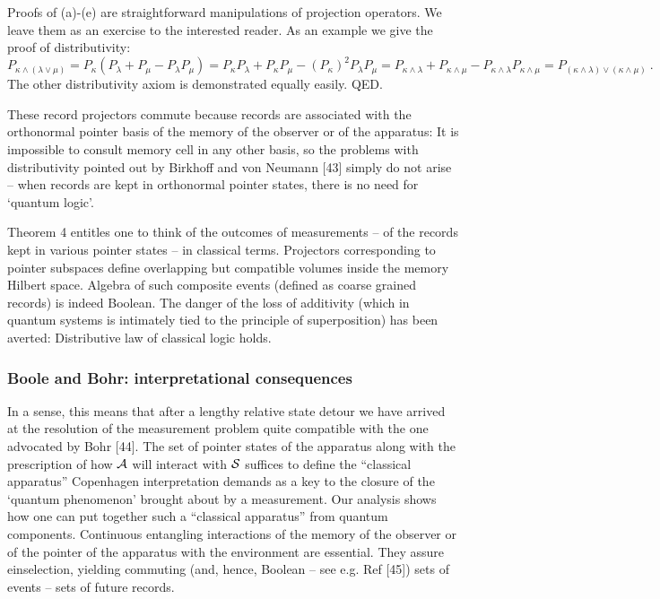\documentclass[aps,twocolumn,pra,epsfig]{revtex4}
\begin{document}
Proofs of (a)-(e) are straightforward manipulations of projection operators.
We leave them as an exercise to the interested reader. As an example we give
the proof of distributivity:
$P_{\kappa\wedge(\lambda\vee\mu)} =
P_{\kappa}(P_{\lambda} + P_{\mu} - P_{\lambda} P_{\mu}) =
P_{\kappa}P_{\lambda} + P_{\kappa}P_{\mu} - (P_{\kappa})^2P_{\lambda} P_{\mu}
 = P_{\kappa \wedge \lambda} + P_{\kappa \wedge \mu} - P_{\kappa \wedge 
\lambda} P_{\kappa \wedge \mu} =
P_{(\kappa \wedge \lambda) \vee (\kappa \wedge \mu)} \ . $ 
The other distributivity axiom is demonstrated equally easily. QED.

These record
projectors commute because records are associated with the orthonormal pointer
basis of the memory of the observer or of the apparatus: It is impossible to
consult memory cell in any other basis, so the problems with distributivity
pointed out by Birkhoff and von Neumann [43] simply do not arise -- 
when records
are kept in orthonormal pointer states, there is no need for `quantum logic'.

Theorem 4 entitles one to think of the outcomes of measurements --
of the records kept in various pointer states -- in classical terms.
Projectors corresponding to pointer subspaces define overlapping but
compatible volumes inside the memory Hilbert space. Algebra of such composite
events (defined as coarse grained records) is indeed Boolean. The danger of
the loss of additivity (which in quantum systems is intimately tied to
the principle of superposition) has been averted: Distributive law of
classical logic holds.

\subsubsection{Boole and Bohr: interpretational consequences}

In a sense, this means that after a lengthy relative state detour we have
arrived at the resolution of the measurement problem quite compatible with 
the one advocated by Bohr [44]. The set of pointer states of the apparatus 
along with the prescription of how ${\cal A}$ will interact with ${\cal S}$ suffices
to define the ``classical apparatus'' Copenhagen interpretation demands as
a key to the closure of the `quantum phenomenon' brought about by a 
measurement.
Our analysis shows how one can put together such a ``classical apparatus''
from quantum components. Continuous entangling interactions of the memory of
the observer or of the pointer of the apparatus with the environment
are essential. They assure einselection, yielding commuting (and, hence,
Boolean -- see e.g. Ref [45]) sets of events -- sets of future records.
\end{document}
